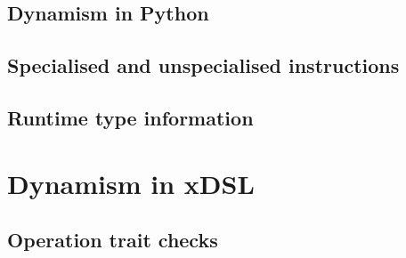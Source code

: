 



\subsection{Dynamism in Python}


\subsection{Specialised and unspecialised instructions}




\subsection{Runtime type information}








\section{Dynamism in xDSL}


\subsection{Operation trait checks}

